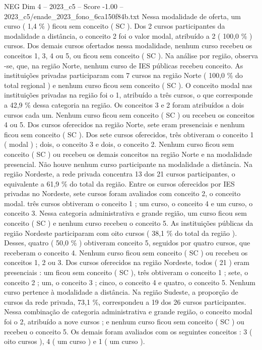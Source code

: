 \begin{textsample}{NEG Dim 4 – 2023\_c5 – Score -1.00 – 2023\_c5/enade\_2023\_fono\_6ca150f84b.txt}
Nessa modalidade de oferta, um curso ( 1,4 \% ) ficou sem conceito ( SC ).
Dos 2 cursos participantes da modalidade a distância, o conceito 2 foi o valor modal, atribuído a 2 ( 100,0 \% ) cursos.
Dos demais cursos ofertados nessa modalidade, nenhum curso recebeu os conceitos 1, 3, 4 ou 5, ou ficou sem conceito ( SC ).
Na análise por região, observa -se, que, na região Norte, nenhum curso de IES públicas recebeu conceito.
As instituições privadas participaram com 7 cursos na região Norte ( 100,0 \% do total regional ) e nenhum curso ficou sem conceito ( SC ).
O conceito modal nas instituições privadas na região foi o 1, atribuído a três cursos, o que corresponde a 42,9 \% dessa categoria na região.
Os conceitos 3 e 2 foram atribuídos a dois cursos cada um.
Nenhum curso ficou sem conceito ( SC ) ou recebeu os conceitos 4 ou 5.
Dos cursos oferecidos na região Norte, sete eram presenciais e nenhum ficou sem conceito ( SC ).
Dos sete cursos oferecidos, três obtiveram o conceito 1 ( modal ) ; dois, o conceito 3 e dois, o conceito 2.
Nenhum curso ficou sem conceito ( SC ) ou recebeu os demais conceitos na região Norte e na modalidade presencial.
Não houve nenhum curso participante na modalidade a distância.
Na região Nordeste, a rede privada concentra 13 dos 21 cursos participantes, o equivalente a 61,9 \% do total da região.
Entre os cursos oferecidos por IES privadas no Nordeste, sete cursos foram avaliados com conceito 2, o conceito modal. três cursos obtiveram o conceito 1 ; um curso, o conceito 4 e um curso, o conceito 3.
Nessa categoria administrativa e grande região, um curso ficou sem conceito ( SC ) e nenhum curso recebeu o conceito 5.
As instituições públicas da região Nordeste participaram com oito cursos ( 38,1 \% do total da região ).
Desses, quatro ( 50,0 \% ) obtiveram conceito 5, seguidos por quatro cursos, que receberam o conceito 4.
Nenhum curso ficou sem conceito ( SC ) ou recebeu os conceitos 1, 2 ou 3.
Dos cursos oferecidos na região Nordeste, todos ( 21 ) eram presenciais : um ficou sem conceito ( SC ), três obtiveram o conceito 1 ; sete, o conceito 2 ; um, o conceito 3 ; cinco, o conceito 4 e quatro, o conceito 5.
Nenhum curso pertence à modalidade a distância.
Na região Sudeste, a proporção de cursos da rede privada, 73,1 \%, correspondeu a 19 dos 26 cursos participantes.
Nessa combinação de categoria administrativa e grande região, o conceito modal foi o 2, atribuído a nove cursos ; e nenhum curso ficou sem conceito ( SC ) ou recebeu o conceito 5.
Os demais foram avaliados com os seguintes conceitos : 3 ( oito cursos ), 4 ( um curso ) e 1 ( um curso ).

\end{textsample}
